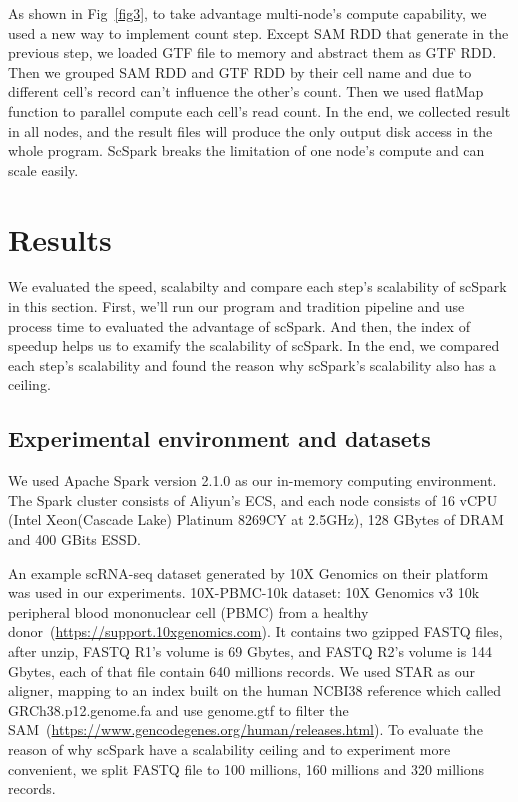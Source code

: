 \documentclass[conference]{IEEEtran}
\begin{document}
As shown in Fig~\ref{fig3}, to take advantage multi-node's compute capability, we used a new way to implement count step. 
Except SAM RDD that generate in the previous step, we loaded GTF file to memory and abstract them as GTF RDD. 
Then we grouped SAM RDD and GTF RDD by their cell name and due to different cell's record can't influence the other's count. 
Then we used flatMap function to parallel compute each cell's read count. 
In the end, we collected result in all nodes, and the result files will produce the only output disk access in the whole program. 
ScSpark breaks the limitation of one node's compute and can scale easily. 

\section{Results}
We evaluated the speed, scalabilty and compare each step's scalability of scSpark in this section. 
First, we'll run our program and tradition pipeline and use process time to evaluated the advantage of scSpark. 
And then, the index of speedup helps us to examify the scalability of scSpark.
In the end, we compared each step's scalability and found the reason why scSpark's scalability also has a ceiling. 

\subsection{Experimental environment and datasets}
We used Apache Spark version 2.1.0 as our in-memory computing environment.
The Spark cluster consists of Aliyun's ECS, and each node consists of 16 vCPU
(Intel Xeon(Cascade Lake) Platinum 8269CY at 2.5GHz), 128 GBytes of DRAM and 400 GBits ESSD.

An example scRNA-seq dataset generated by 10X Genomics on their platform was used in our experiments.
10X-PBMC-10k dataset: 10X Genomics v3 10k peripheral blood mononuclear cell (PBMC) from a healthy donor~(\url{https://support.10xgenomics.com}). 
It contains two gzipped FASTQ files, after unzip, FASTQ R1's volume is 69 Gbytes, and FASTQ R2's volume is 144 Gbytes, each of that file contain 640 millions records.
We used STAR as our aligner, mapping to an index built on the human NCBI38 reference which called GRCh38.p12.genome.fa and use genome.gtf to filter the SAM~(\url{https://www.gencodegenes.org/human/releases.html}).
To evaluate the reason of why scSpark have a scalability ceiling and to experiment more convenient, we split FASTQ file to 100 millions, 160 millions and 320 millions records. 
\end{document}
